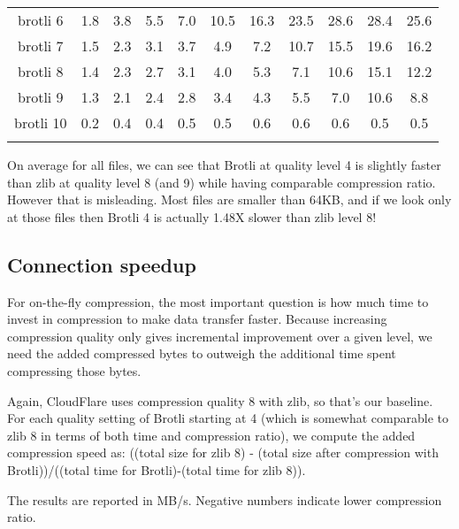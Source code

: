 \documentclass[12pt]{article}
\begin{document}
\begin{table}[H]
\begin{threeparttable}
\begin{tabular}{ccccccccccc}
  brotli 6 & 1.8 & 3.8 & 5.5 & 7.0 & 10.5 & 16.3 & 23.5 & 28.6 & 28.4 & 25.6 \\
  brotli 7 & 1.5 & 2.3 & 3.1 & 3.7 & 4.9 & 7.2 & 10.7 & 15.5 & 19.6 & 16.2 \\
  brotli 8 & 1.4 & 2.3 & 2.7 & 3.1 & 4.0 & 5.3 & 7.1 & 10.6 & 15.1 & 12.2 \\
  brotli 9 & 1.3 & 2.1 & 2.4 & 2.8 & 3.4 & 4.3 & 5.5 & 7.0 & 10.6 & 8.8 \\
  brotli 10 & 0.2 & 0.4 & 0.4 & 0.5 & 0.5 & 0.6 & 0.6 & 0.6 & 0.5 & 0.5 \\
  \bottomrule\addlinespace[1ex]
\end{tabular}
\end{threeparttable}
\end{table}


On average for all files, we can see that Brotli at quality level 4 is
slightly faster than zlib at quality level 8 (and 9) while having
comparable compression ratio. However that is misleading. Most files are
smaller than 64KB, and if we look only at those files then Brotli 4 is
actually 1.48X slower than zlib level 8!

\subsection{Connection speedup}

For on-the-fly compression, the most important question is how much time
to invest in compression to make data transfer faster. Because
increasing compression quality only gives incremental improvement over a
given level, we need the added compressed bytes to outweigh the
additional time spent compressing those bytes.

Again, CloudFlare uses compression quality 8 with zlib, so that’s our
baseline. For each quality setting of Brotli starting at 4 (which is
somewhat comparable to zlib 8 in terms of both time and compression
ratio), we compute the added compression speed as: ((total size for zlib
8) - (total size after compression with Brotli))/((total time for
Brotli)-(total time for zlib 8)).

The results are reported in MB/s. Negative numbers indicate lower
compression ratio.
\end{document}
